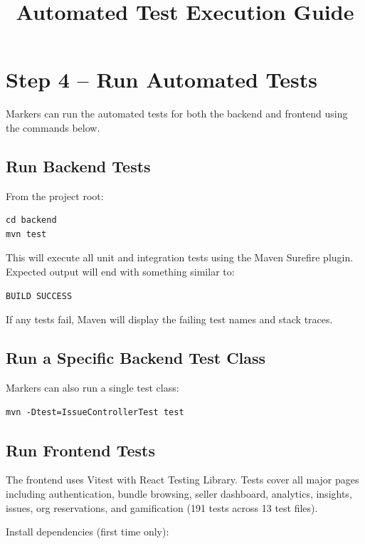 \documentclass[12pt]{article}
\title{Automated Test Execution Guide}
\author{}
\date{}
\begin{document}
\maketitle

\section{Step 4 – Run Automated Tests}

Markers can run the automated tests for both the backend and frontend using the commands below.

\subsection{Run Backend Tests}

From the project root:

\begin{lstlisting}
cd backend
mvn test
\end{lstlisting}

This will execute all unit and integration tests using the Maven Surefire plugin.
Expected output will end with something similar to:

\begin{lstlisting}
BUILD SUCCESS
\end{lstlisting}

If any tests fail, Maven will display the failing test names and stack traces.

\subsection{Run a Specific Backend Test Class}

Markers can also run a single test class:

\begin{lstlisting}
mvn -Dtest=IssueControllerTest test
\end{lstlisting}

\subsection{Run Frontend Tests}

The frontend uses Vitest with React Testing Library. Tests cover all major pages including
authentication, bundle browsing, seller dashboard, analytics, insights, issues, org
reservations, and gamification (191 tests across 13 test files).

Install dependencies (first time only):
\end{document}
